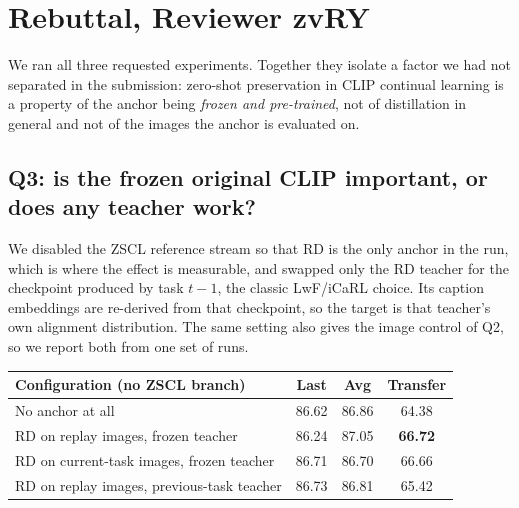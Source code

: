 %
%

\section*{Rebuttal, Reviewer zvRY}

We ran all three requested experiments. Together they isolate a factor we had
not separated in the submission: zero-shot preservation in CLIP continual
learning is a property of the anchor being \emph{frozen and pre-trained}, not of
distillation in general and not of the images the anchor is evaluated on.

\subsection*{Q3: is the frozen original CLIP important, or does any teacher work?}

We disabled the ZSCL reference stream so that RD is the only anchor in the run,
which is where the effect is measurable, and swapped only the RD teacher for the
checkpoint produced by task $t{-}1$, the classic LwF/iCaRL choice. Its caption
embeddings are re-derived from that checkpoint, so the target is that teacher's
own alignment distribution. The same setting also gives the image control of Q2,
so we report both from one set of runs.

\begin{table}[h]\centering\small
\begin{tabular}{lccc}
\hline
\textbf{Configuration (no ZSCL branch)} & \textbf{Last} & \textbf{Avg} & \textbf{Transfer} \\
\hline
No anchor at all & 86.62 & 86.86 & 64.38 \\
RD on replay images, frozen teacher & 86.24 & 87.05 & \textbf{66.72} \\
RD on current-task images, frozen teacher & 86.71 & 86.70 & 66.66 \\
RD on replay images, previous-task teacher & 86.73 & 86.81 & 65.42 \\
\hline
\end{tabular}
\end{table}

